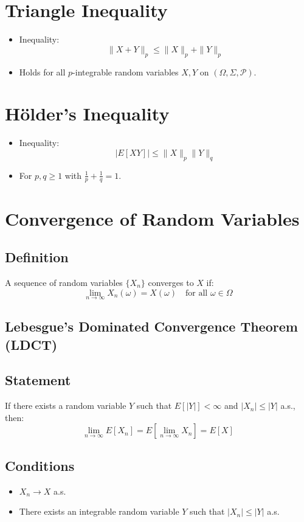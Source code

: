 \documentclass{article}
\begin{document}
\section*{Triangle Inequality}
\begin{itemize}
    \item Inequality:
    \[
    \|X + Y\|_p \leq \|X\|_p + \|Y\|_p
    \]
    \item Holds for all $p$-integrable random variables $X, Y$ on $(\Omega, \Sigma, \mathcal{P})$.
\end{itemize}

\section*{Hölder's Inequality}
\begin{itemize}
    \item Inequality:
    \[
    |E[XY]| \leq \|X\|_p \|Y\|_q
    \]
    \item For $p, q \geq 1$ with $\frac{1}{p} + \frac{1}{q} = 1$.
\end{itemize}


\section*{Convergence of Random Variables}

\subsection*{Definition}
A sequence of random variables $\{X_n\}$ converges to $X$ if:
\[
\lim_{n \to \infty} X_n(\omega) = X(\omega) \quad \text{for all } \omega \in \Omega
\]

\subsection*{Lebesgue's Dominated Convergence Theorem (LDCT)}
\subsection*{Statement}
If there exists a random variable $Y$ such that $E[|Y|] < \infty$ and $|X_n| \leq |Y|$ a.s., then:
\[
\lim_{n \to \infty} E[X_n] = E\left[\lim_{n \to \infty} X_n\right] = E[X]
\]

\subsection*{Conditions}
\begin{itemize}
    \item $X_n \to X$ a.s.
    \item There exists an integrable random variable $Y$ such that $|X_n| \leq |Y|$ a.s.
\end{itemize}
\end{document}
